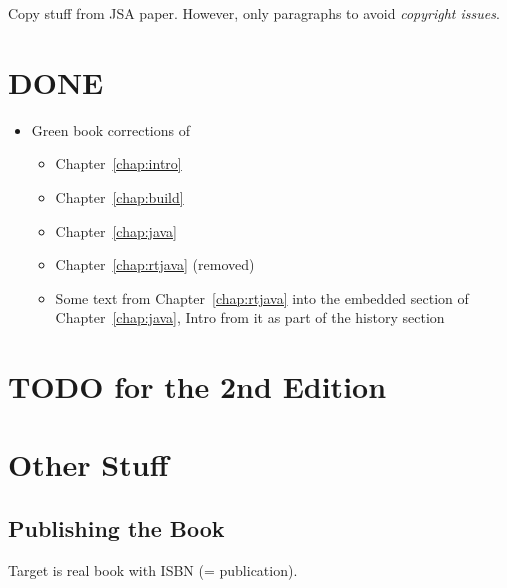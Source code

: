 Copy stuff from JSA paper. However, only paragraphs to avoid
\emph{copyright issues}.

\chapter{DONE}

\begin{itemize}
  \item Green book corrections of
  \begin{itemize}
    \item Chapter~\ref{chap:intro}
    \item Chapter~\ref{chap:build}
    \item Chapter~\ref{chap:java}
    \item Chapter~\ref{chap:rtjava} (removed)
       \item Some text from Chapter~\ref{chap:rtjava} into
           the embedded section of Chapter~\ref{chap:java},
           Intro from it as part of the history section

  \end{itemize}
\end{itemize}

\chapter{TODO for the 2nd Edition}

\chapter{Other Stuff}

\section{Publishing the Book}

Target is real book with ISBN (= publication).

